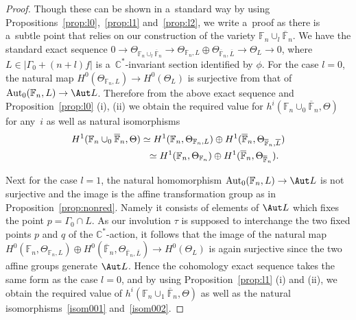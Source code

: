 \begin{proof}
Though these can be shown in a~standard way by using Propositions~\ref{prop:l0},~\ref{prop:l1} and~\ref{prop:l2}, we
write a~proof as there is a~subtle point that relies on our construction of the variety
$\mathbb{F}_n\cup_l\overline{\mathbb{F}}_n$.
We have the standard exact sequence $0 \to \Theta_{\mathbb{F}_n\cup_l \overline{\mathbb{F}}_n} \to
\Theta_{\mathbb{F}_n,L}\oplus\Theta_{\overline{\mathbb{F}}_n,\overline L}\to \Theta_L\to 0$, where $L\in
|\Gamma_0+(n+l)f|$ is a~$\mathbb{C}^*$-invariant section identif\/ied by $\phi$.
For the case $l=0$, the natural map $H^0(\Theta_{\mathbb{F}_n,L}) \to H^0(\Theta_{L})$ is surjective from that of
${\rm{Aut}}_0(\mathbb{F}_n,L)\to \Aut L$.
Therefore from the above exact sequence and Proposition~\ref{prop:l0} (i), (ii) we obtain the required value for $h^i
(\mathbb{F}_n \cup_0 \overline{\mathbb{F}}_n,\Theta)$ for any~$i$ as well as natural isomorphisms {\samepage
\begin{gather}
H^1(\mathbb{F}_n \cup_0 \overline{\mathbb{F}}_n,\Theta)  \simeq H^1(\mathbb{F}_n, \Theta_{\mathbb{F}_n,L}) \oplus H^1
(\overline{\mathbb{F}}_n,\Theta_{\overline{\mathbb{F}}_n,\overline L})
\label{isom001}
\\
\hphantom{H^1(\mathbb{F}_n \cup_0 \overline{\mathbb{F}}_n,\Theta)}{}
\simeq H^1(\mathbb{F}_n, \Theta_{\mathbb{F}_n}) \oplus H^1 (\overline{\mathbb{F}}_n,\Theta_{\overline{\mathbb{F}}_n}).
\label{isom002}
\end{gather}}

\noindent
Next  for the case $l=1$, the natural homomorphism ${\rm{Aut}}_0(\mathbb{F}_n,L)\to \Aut L$ is not surjective and the
image is the af\/f\/ine transformation group as in Proposition~\ref{prop:nonred}.
Namely it consists of elements of $\Aut L$ which f\/ixes the point $p=\Gamma_0\cap L$.
As our involution $\tau$ is supposed to interchange the two f\/ixed points $p$ and $q$ of the $\mathbb{C}^*$-action, it
follows that the image of the natural map $H^0(\mathbb{F}_n, \Theta_{\mathbb{F}_n,L}) \oplus H^0
(\overline{\mathbb{F}}_n,\Theta_{\overline{\mathbb{F}}_n,\overline L})\to H^0(\Theta_L)$ is again surjective since the
two af\/f\/ine groups generate $\Aut L$.
Hence the cohomology exact sequence takes the same form as the case $l=0$, and by using Proposition~\ref{prop:l1} (i)
and (ii), we obtain the required value of $h^i (\mathbb{F}_n \cup_1 \overline{\mathbb{F}}_n,\Theta)$ as well as the
natural isomorphisms~\eqref{isom001} and~\eqref{isom002}.


\end{proof}
